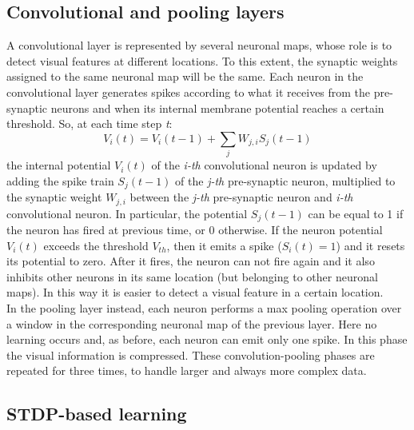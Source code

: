 \documentclass[11pt,a4paper]{scrartcl}
\begin{document}
\subsection{Convolutional and pooling layers}

A convolutional layer is represented by several neuronal maps, whose role is to detect visual features at different locations. To this extent, the synaptic weights assigned to the same neuronal map will be the same. Each neuron in the convolutional layer generates spikes according to what it receives from the pre-synaptic neurons and when its internal membrane potential reaches a certain threshold. So, at each time step \textit{t}:
\begin{equation*}
	V_{i}(t) = V_{i}(t-1) + \sum_{j}W_{j,i}S_{j}(t-1)
\end{equation*}
the internal potential $ V_{i}(t) $ of the \textit{i-th} convolutional neuron is updated by adding the spike train $ S_{j}(t-1) $ of the \textit{j-th} pre-synaptic neuron, multiplied to the synaptic weight $ W_{j,i} $ between the \textit{j-th} pre-synaptic neuron and \textit{i-th} convolutional neuron. In particular, the potential $ S_{j}(t-1) $ can be equal to 1 if the neuron has fired at previous time, or 0 otherwise. If the neuron potential $ V_{i}(t) $ exceeds the threshold $ V_{th} $, then it emits a spike ($ S_{i}(t) = 1 $) and it resets its potential to zero. After it fires, the neuron can not fire again and it also inhibits other neurons in its same location (but belonging to other neuronal maps). In this way it is easier to detect a visual feature in a certain location.\\
In the pooling layer instead, each neuron performs a max pooling operation over a window in the corresponding neuronal map of the previous layer. Here no learning occurs and, as before, each neuron can emit only one spike. In this phase the visual information is compressed. These convolution-pooling phases are repeated for three times, to handle larger and always more complex data.

\subsection{STDP-based learning}
\end{document}
